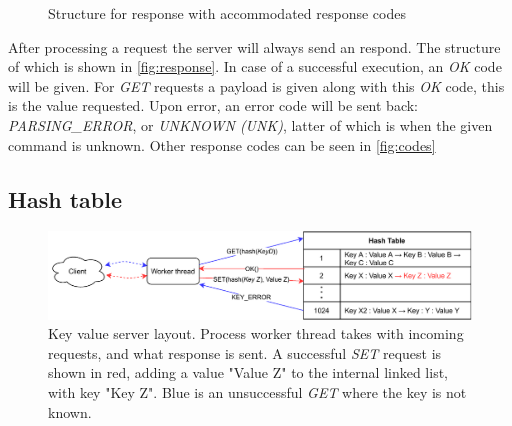 \begin{figure}
    \centering
    \caption{Structure for response with accommodated response codes}
\end{figure}

After processing a request the server will always send an respond.
The structure of which is shown in \ref{fig:response}.
In case of a successful execution, an \textit{OK} code will be given.
For \textit{GET} requests a payload is given along with this \textit{OK} code, this is the value requested.
Upon error, an error code will be sent back: \textit{PARSING\_ERROR}, or \textit{UNKNOWN (UNK)}, latter of which is when the given command is unknown.
Other response codes can be seen in \ref{fig:codes}


\subsection{Hash table}

\begin{figure}
    \centering
    \includegraphics[width=\columnwidth]{figures/PDF/Client_to_hash_table}
    \caption[Key value server layout]{Key value server layout. Process worker thread takes with incoming requests, and what response is sent. A successful \textit{SET} request is shown in red, adding a value "Value Z" to the internal linked list, with key "Key Z". Blue is an unsuccessful \textit{GET} where the key is not known.}
    \label{fig:hash_table}
\end{figure}

